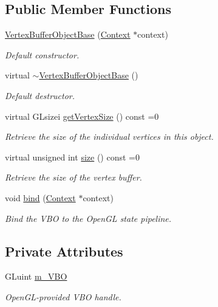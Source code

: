 \subsection*{Public Member Functions}
\begin{DoxyCompactItemize}
\item 
\hyperlink{class_vertex_buffer_object_base_ab08c82b0b8b58d6dc0d7aa0c218eed98}{Vertex\+Buffer\+Object\+Base} (\hyperlink{class_context}{Context} $\ast$context)
\begin{DoxyCompactList}\small\item\em Default constructor. \end{DoxyCompactList}\item 
virtual \hyperlink{class_vertex_buffer_object_base_acc84ed51a8fa9e78e5692e5695ce2d17}{$\sim$\+Vertex\+Buffer\+Object\+Base} ()
\begin{DoxyCompactList}\small\item\em Default destructor. \end{DoxyCompactList}\item 
virtual G\+Lsizei \hyperlink{class_vertex_buffer_object_base_aff976ee272a27c43b95ee0c6cb0a7506}{get\+Vertex\+Size} () const  =0
\begin{DoxyCompactList}\small\item\em Retrieve the size of the individual vertices in this object. \end{DoxyCompactList}\item 
virtual unsigned int \hyperlink{class_vertex_buffer_object_base_ab11e9eae754a9b12012242042d9637f0}{size} () const  =0
\begin{DoxyCompactList}\small\item\em Retrieve the size of the vertex buffer. \end{DoxyCompactList}\item 
void \hyperlink{class_vertex_buffer_object_base_a364a7e5955125bf8fda040109e9734e4}{bind} (\hyperlink{class_context}{Context} $\ast$context)
\begin{DoxyCompactList}\small\item\em Bind the V\+BO to the Open\+GL state pipeline. \end{DoxyCompactList}\end{DoxyCompactItemize}
\subsection*{Private Attributes}
\begin{DoxyCompactItemize}
\item 
G\+Luint \hyperlink{class_vertex_buffer_object_base_a93987eea648e4c871c404716e1af8b8d}{m\+\_\+\+V\+BO}
\begin{DoxyCompactList}\small\item\em Open\+G\+L-\/provided V\+BO handle. \end{DoxyCompactList}\end{DoxyCompactItemize}


